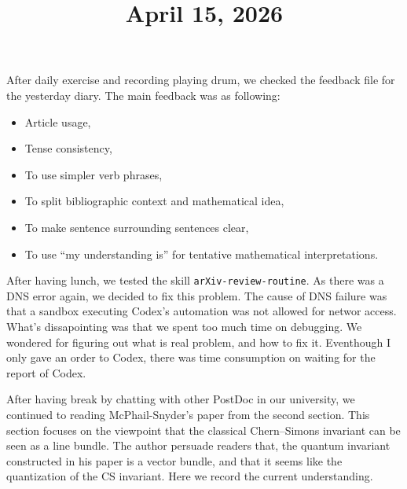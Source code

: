 \documentclass[11pt]{amsart}
\title{April 15, 2026}
\begin{document}
\maketitle

After daily exercise and recording playing drum, we checked the feedback file for the yesterday diary.
The main feedback was as following:
\begin{itemize}
    \item Article usage,
    \item Tense consistency,
    \item To use simpler verb phrases,
    \item To split bibliographic context and mathematical idea,
    \item To make sentence surrounding sentences clear,
    \item To use ``my understanding is'' for tentative mathematical interpretations.
\end{itemize}

\par\vspace{1em}
After having lunch, we tested the skill \texttt{arXiv-review-routine}.
As there was a DNS error again, we decided to fix this problem.
The cause of DNS failure was that a sandbox executing Codex's automation was not allowed for networ access.
What's dissapointing was that we spent too much time on debugging.
We wondered for figuring out what is real problem, and how to fix it.
Eventhough I only gave an order to Codex, there was time consumption on waiting for the report of Codex.

\par\vspace{1em}
After having break by chatting with other PostDoc in our university, we continued to reading McPhail-Snyder's paper from the second section.
This section focuses on the viewpoint that the classical Chern--Simons invariant can be seen as a line bundle.
The author persuade readers that, the quantum invariant constructed in his paper is a vector bundle, and that it seems like the quantization of the CS invariant.
Here we record the current understanding.

\par\vspace{1em}
\end{document}
